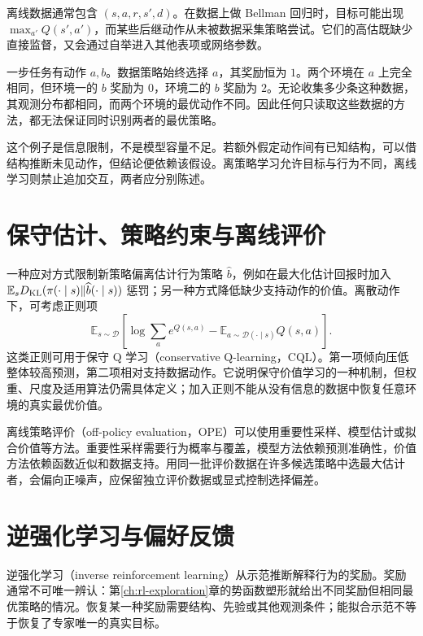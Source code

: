 \documentclass[UTF8,12pt,a4paper,fontset=fandol]{ctexbook}
\begin{document}
离线数据通常包含 $(s,a,r,s',d)$。在数据上做 Bellman 回归时，目标可能出现 $\max_{a'}Q(s',a')$，而某些后继动作从未被数据采集策略尝试。它们的高估既缺少直接监督，又会通过自举进入其他表项或网络参数。

\begin{example}[无限数据也未必足够]
一步任务有动作 $a,b$。数据策略始终选择 $a$，其奖励恒为 $1$。两个环境在 $a$ 上完全相同，但环境一的 $b$ 奖励为 $0$，环境二的 $b$ 奖励为 $2$。无论收集多少条这种数据，其观测分布都相同，而两个环境的最优动作不同。因此任何只读取这些数据的方法，都无法保证同时识别两者的最优策略。
\end{example}

这个例子是信息限制，不是模型容量不足。若额外假定动作间有已知结构，可以借结构推断未见动作，但结论便依赖该假设。离策略学习允许目标与行为不同，离线学习则禁止追加交互，两者应分别陈述。

\section{保守估计、策略约束与离线评价}

一种应对方式限制新策略偏离估计行为策略 $\widehat b$，例如在最大化估计回报时加入 $\mathbb E_sD_{\rm KL}(\pi(\cdot\mid s)\|\widehat b(\cdot\mid s))$ 惩罚；另一种方式降低缺少支持动作的价值。离散动作下，可考虑正则项
\[
\mathbb E_{s\sim\mathcal D}\left[\log\sum_a e^{Q(s,a)}-\mathbb E_{a\sim\mathcal D(\cdot\mid s)}Q(s,a)\right].
\]
这类正则可用于保守 Q 学习（conservative Q-learning，CQL）\cite{kumar-cql}。第一项倾向压低整体较高预测，第二项相对支持数据动作。它说明保守价值学习的一种机制，但权重、尺度及适用算法仍需具体定义；加入正则不能从没有信息的数据中恢复任意环境的真实最优价值。

离线策略评价（off-policy evaluation，OPE）可以使用重要性采样、模型估计或拟合价值等方法。重要性采样需要行为概率与覆盖，模型方法依赖预测准确性，价值方法依赖函数近似和数据支持。用同一批评价数据在许多候选策略中选最大估计者，会偏向正噪声，应保留独立评价数据或显式控制选择偏差。

\section{逆强化学习与偏好反馈}

逆强化学习（inverse reinforcement learning）从示范推断解释行为的奖励。奖励通常不可唯一辨认：第\ref{ch:rl-exploration}章的势函数塑形就给出不同奖励但相同最优策略的情况。恢复某一种奖励需要结构、先验或其他观测条件；能拟合示范不等于恢复了专家唯一的真实目标。
\end{document}
